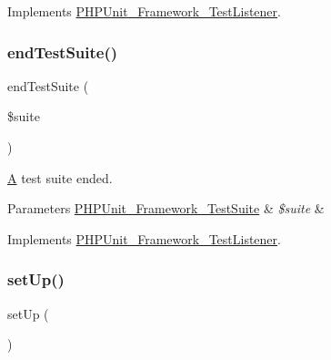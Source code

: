 Implements \mbox{\hyperlink{interface_p_h_p_unit___framework___test_listener_a6de65eea8b294795cbc34c4c8cee8546}{P\+H\+P\+Unit\+\_\+\+Framework\+\_\+\+Test\+Listener}}.

\mbox{\label{class_framework___test_listener_test_aeec28a4d1328434916ebcdc1ca6b5527}} 
\subsubsection{\texorpdfstring{end\+Test\+Suite()}{endTestSuite()}}
{\footnotesize\ttfamily end\+Test\+Suite (\begin{DoxyParamCaption}\item[{\mbox{\hyperlink{class_p_h_p_unit___framework___test_suite}{P\+H\+P\+Unit\+\_\+\+Framework\+\_\+\+Test\+Suite}}}]{\$suite }\end{DoxyParamCaption})}

\mbox{\hyperlink{class_a}{A}} test suite ended.


\begin{DoxyParams}[1]{Parameters}
\mbox{\hyperlink{class_p_h_p_unit___framework___test_suite}{P\+H\+P\+Unit\+\_\+\+Framework\+\_\+\+Test\+Suite}} & {\em \$suite} & \\
\hline
\end{DoxyParams}


Implements \mbox{\hyperlink{interface_p_h_p_unit___framework___test_listener_aeec28a4d1328434916ebcdc1ca6b5527}{P\+H\+P\+Unit\+\_\+\+Framework\+\_\+\+Test\+Listener}}.

\mbox{\label{class_framework___test_listener_test_a0bc688732d2b3b162ffebaf7812e78da}} 
\subsubsection{\texorpdfstring{set\+Up()}{setUp()}}
{\footnotesize\ttfamily set\+Up (\begin{DoxyParamCaption}{ }\end{DoxyParamCaption})\hspace{0.3cm}{\ttfamily [protected]}}

